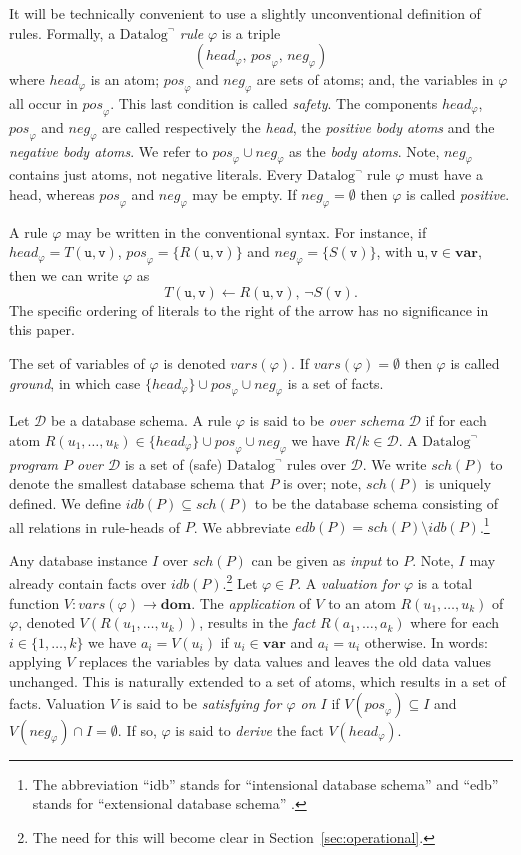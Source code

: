 \documentclass{tlp}
\newcommand{\langname}[1]{\text{#1}}  \newcommand{\pred}[1]{\mathtt{#1}}  \newcommand{\fname}[1]{\mathit{#1}}  \newcommand{\sq}[1]{`{#1}'}
\newcommand{\datalogneg}{\langname{Datalog}^{\neg}}
\newcommand{\rar}[2]{#1/#2}
\newcommand{\sch}{\mathcal{D}}
\newcommand{\univ}{\mathbf{dom}}
\newcommand{\rl}{\varphi}
\newcommand{\head}[1]{\fname{head}_{#1}}
\newcommand{\bpos}[1]{\fname{pos}_{#1}}
\newcommand{\bneg}[1]{\fname{neg}_{#1}}
\newcommand{\idb}[1]{\fname{idb}(#1)}
\newcommand{\edb}[1]{\fname{edb}(#1)}
\newcommand{\schof}[1]{\fname{sch}(#1)}
\newcommand{\vars}[1]{\fname{vars}(#1)}
\newcommand{\uvar}{\mathbf{var}}
\newcommand{\var}[1]{\mathtt{#1}}
\begin{document}
It will be technically convenient to use a slightly unconventional
definition of rules. Formally, a $\datalogneg$ \emph{rule} $\rl$
is a triple
\[
(\head{\rl},\,\bpos{\rl},\,\bneg{\rl})
\]
where $\head{\rl}$ is an atom; $\bpos{\rl}$ and $\bneg{\rl}$ are
sets of atoms; and, the variables in $\rl$ all occur in $\bpos{\rl}$.
This last condition is called \emph{safety}. The components $\head{\rl}$,
$\bpos{\rl}$ and $\bneg{\rl}$ are called respectively the \emph{head},
the \emph{positive body atoms} and the \emph{negative body atoms}.
We refer to $\bpos{\rl}\cup\bneg{\rl}$ as the \emph{body atoms}.
Note, $\bneg{\rl}$ contains just atoms, not negative literals. Every
$\datalogneg$ rule $\rl$ must have a head, whereas $\bpos{\rl}$
and $\bneg{\rl}$ may be empty. If $\bneg{\rl}=\emptyset$ then $\rl$
is called \emph{positive}.

A rule $\rl$ may be written in the conventional syntax. For instance,
if $\head{\rl}=T(\var u,\var v)$, $\bpos{\rl}=\{R(\var u,\var v)\}$
and $\bneg{\rl}=\{S(\var v)\}$, with $\var u,\var v\in\uvar$, then
we can write $\rl$ as
\[
T(\var u,\var v)\gets R(\var u,\var v),\,\neg S(\var v).
\]
The specific ordering of literals to the right of the arrow has no
significance in this paper.

The set of variables of $\rl$ is denoted $\vars{\rl}$.  If $\vars{\rl}=\emptyset$
then $\rl$ is called \emph{ground}, in which case $\{\head{\rl}\}\cup\bpos{\rl}\cup\bneg{\rl}$
is a set of facts.



Let $\sch$ be a database schema. A rule $\rl$ is said to be \emph{over
schema} $\sch$ if for each atom $R(u_{1},\ldots,u_{k})\in\{\head{\rl}\}\cup\bpos{\rl}\cup\bneg{\rl}$
we have $\rar Rk\in\sch$. A $\datalogneg$ \emph{program $P$ over
$\sch$} is a set of (safe) $\datalogneg$ rules over $\sch$. 
We write $\schof P$ to denote the smallest database schema that $P$
is over; note, $\schof P$ is uniquely defined. We define $\idb P\subseteq\schof P$
to be the database schema consisting of all relations in rule-heads
of $P$. We abbreviate $\edb P=\schof P\setminus\idb P$.\footnote{The abbreviation ``idb'' stands for ``intensional database schema''
and ``edb'' stands for ``extensional database schema'' \cite{ahv_book}.} 

Any database instance $I$ over $\schof P$ can be given as \emph{input}
to $P$. Note, $I$ may already contain facts over $\idb P$.\footnote{The need for this will become clear in Section~\ref{sec:operational}.} Let $\rl\in P$. A \emph{valuation for} $\rl$ is a total function
$V:\vars{\rl}\to\univ$. The \emph{application} of $V$ to an atom
$R(u_{1},\ldots,u_{k})$ of $\rl$, denoted $V(R(u_{1},\ldots,u_{k}))$,
results in the \emph{fact} $R(a_{1},\ldots,a_{k})$ where for each
$i\in\{1,\ldots,k\}$ we have $a_{i}=V(u_{i})$ if $u_{i}\in\uvar$
and $a_{i}=u_{i}$ otherwise. In words: applying $V$ replaces the
variables by data values and leaves the old data values unchanged.
This is naturally extended to a set of atoms, which results in a set
of facts. Valuation $V$ is said to be \emph{satisfying for $\rl$
on $I$} if $V(\bpos{\rl})\subseteq I$ and $V(\bneg{\rl})\cap I=\emptyset$.
If so, $\rl$ is said to \emph{derive} the fact $V(\head{\rl})$.
\end{document}
